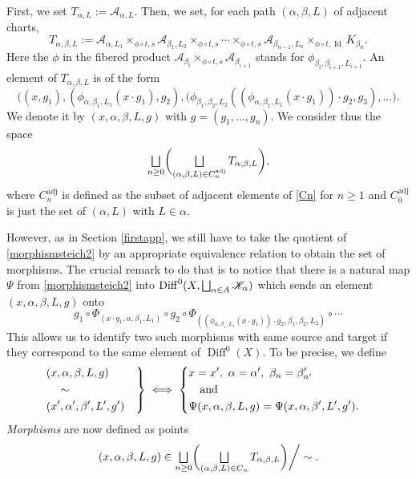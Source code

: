 \documentclass[JEP,XML,SOM,Unicode]{cedram}
\let\mathcal\mathscr
\let\oldbigsqcup\bigsqcup
\renewcommand{\bigsqcup}{\mathop{\textstyle\oldbigsqcup}\displaylimits}
\newcommand{\adj}{\mathrm{adj}}
\DeclareMathOperator{\Diff}{Diff}
\DeclareMathOperator{\Id}{Id}
\theoremstyle{plain}
\theoremstyle{definition}
\theoremstyle{remark}
\numberwithin{equation}{section}
\newcommand{\DK}{\Diff^0(X,\bigsqcup_{\alpha\in A}\mathcal K_\alpha)}
\let\uniondisjointe\bigsqcup
\begin{document}
First, we set $T_{\alpha, L}:=\mathcal A_{\alpha,L}$. Then, we set, for each path $(\alpha,\beta,L)$ of adjacent charts,%
\begin{equation}
\label{morphismsteich1}
T_{\alpha,\beta,L}:=\mathcal A_{\alpha, L_1}\times_{\phi\circ t,s} \mathcal A_{\beta_1,L_2}\times_{\phi\circ t,s}\cdots\times_{\phi\circ t,s} \mathcal A_{\beta_{n-1},L_n}\times_{\phi\circ t,\Id}K_{\beta_n}.
\end{equation}
Here the $\phi$ in the fibered product $\mathcal A_{\beta_i}\times_{\phi\circ t,s}\mathcal A_{\beta_{i+1}}$ stands for $\phi_{\beta_{i},\beta_{i+1}, L_{i+1}}$. An element of $T_{\alpha, \beta, L}$ is of the form
\begin{equation}
\label{elementT}
\Big ((x,g_1),(\phi_{\alpha,\beta_1,L_1}(x\cdot g_1),g_2),(\phi_{\beta_1,\beta_2,L_2}((\phi_{\alpha,\beta_1,L_1}(x\cdot g_1))\cdot g_2,g_3),\hdots \Big ).
\end{equation}
We denote it by $(x,\alpha,\beta,L,g)$ with $g=(g_1,\hdots,g_n)$. We consider thus the space
\begin{equation}
\label{morphismsteich2}
\uniondisjointe_{n\geq 0}\biggl (\uniondisjointe_{(\alpha,\beta, L) \in C^{\adj}_{n}} T_{\alpha,\beta, L}\biggr),
\end{equation}
where $C^{\adj}_n$ is defined as the subset of adjacent elements of \eqref{Cn} for $n\geq 1$ and $C^{\adj}_0$ is just the set of $(\alpha, L)$ with $L\in\alpha$.

However, as in Section \ref{firstapp}, we still have to take the quotient of \eqref{morphismsteich2} by an appropriate equivalence relation to obtain the set of morphisms. The crucial remark to do that is to notice that there is a natural map $\Psi$ from \eqref{morphismsteich2} into $\DK$ which sends an element $(x,\alpha,\beta,L,g)$ onto
\begin{equation}
\label{elementDiff}
g_1\circ \Phi_{(x\cdot g_1,\alpha,\beta_1, L_1)}\circ g_2\circ \Phi_{((\phi_{\alpha,\beta_1,L_1}(x\cdot g_1))\cdot g_2,\beta_1,\beta_2, L_2)}\circ\cdots
\end{equation}
This allows us to identify two such morphisms with same source and target if they correspond to the same element of $\Diff^0(X)$. To be precise, we define
\begin{equation}
\label{morphismsteich3}
\left .
\begin{aligned}
&(x,\alpha,\beta,L,g)\cr
&\quad\sim\cr
&(x',\alpha',\beta',L',g')
\end{aligned}
\right \}\iff\left\{
\begin{aligned}
&x=x',\ \alpha=\alpha',\ \beta_n=\beta'_{n'}\cr
&\quad\text{and}\cr
&\Psi(x,\alpha,\beta,L,g)=\Psi(x,\alpha,\beta',L',g').
\end{aligned}
\right .
\end{equation}
\emph{Morphisms} are now defined as points
\begin{equation}
\label{morphismsteich4}
(x,\alpha,\beta,L,g)\in\uniondisjointe_{n\geq 0}\biggl (\uniondisjointe_{(\alpha,\beta,L)\in C_{n}}T_{\alpha,\beta, L}\biggr )\bigg /\sim.
\end{equation}
\end{document}
